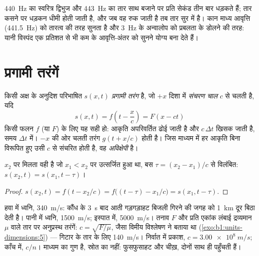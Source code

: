 \begin{example}[कान से स्वर मिलाना]\label{ex:b1:wave-propagation:tuning}
\qty{440}{Hz} का स्वरित्र द्विभुज और \qty{443}{Hz} का तार साथ बजाने पर प्रति
सेकंड तीन बार धड़कते हैं; तार कसने पर धड़कन धीमी होती जाती है, और जब वह रुक
जाती है तब तार सुर में है। कान माध्य आवृत्ति (\qty{441.5}{Hz}) को तारत्व की
तरह सुनता है और \qty{3}{Hz} के अन्वालोप को प्रबलता के डोलने की तरह: यानी
विस्पंद एक प्रतिशत से भी कम के आवृत्ति-अंतर को सुनने योग्य बना देते हैं।
\end{example}

\section{प्रगामी तरंगें}

\begin{definition}[प्रगामी तरंग, संचरण चाल]\label{def:b1:wave-propagation:travelling}
किसी अक्ष के अनुदिश परिभाषित  $s(x, t)$ \emph{प्रगामी तरंग} है, जो
$+x$ दिशा में \emph{संचरण चाल} $c$ से चलती है, यदि
\[
s(x, t) = f\!\left(t - \frac{x}{c}\right) = F(x - ct)
\]
किसी फलन $f$ (या $F$) के लिए यह सही हो: आकृति अपरिवर्तित ढोई जाती है और
$c\,\Delta t$ खिसक जाती है, समय $\Delta t$ में। $-x$ की ओर चलती तरंग
$g(t + x/c)$ होती है। जिस माध्यम में हर आकृति बिना विरूपित हुए उसी $c$ से
संचरित होती है, वह \emph{अविक्षेपी} है।
\end{definition}

\begin{proposition}[विलंब]\label{prop:b1:wave-propagation:delay}
$x_2$ पर मिलता  वही है जो $x_1 < x_2$ पर उत्सर्जित हुआ था, बस
$\tau = (x_2 - x_1)/c$ से विलंबित: $s(x_2, t) = s(x_1, t - \tau)$।
\end{proposition}

\begin{proof}
$s(x_2, t) = f(t - x_2/c) = f\big((t - \tau) - x_1/c\big) = s(x_1, t - \tau)$.
\end{proof}

\begin{example}[संचरण चालें]\label{ex:b1:wave-propagation:celerities}
हवा में ध्वनि, \qty{340}{m/s}: कौंध के \qty{3}{s} बाद आती गड़गड़ाहट बिजली
गिरने की जगह को \qty{1}{km} दूर बिठा देती है। पानी में ध्वनि, \qty{1500}{m/s};
इस्पात में, \qty{5000}{m/s}। तनाव $F$ और प्रति एकांक लंबाई द्रव्यमान $\mu$
वाले तार पर अनुप्रस्थ तरंगें: $c = \sqrt{F/\mu}$, जैसा विमीय विश्लेषण ने
बताया था (\cref{exo:b1:units-dimensions:5}) --- गिटार के तार के लिए
\qty{140}{m/s}। निर्वात में प्रकाश, $c = \qty{3.00e8}{m/s}$; काँच में,
$c/n$।  माध्यम का गुण है, स्रोत का नहीं: फुसफुसाहट और चीख़, दोनों
साथ ही पहुँचती हैं।
\end{example}

